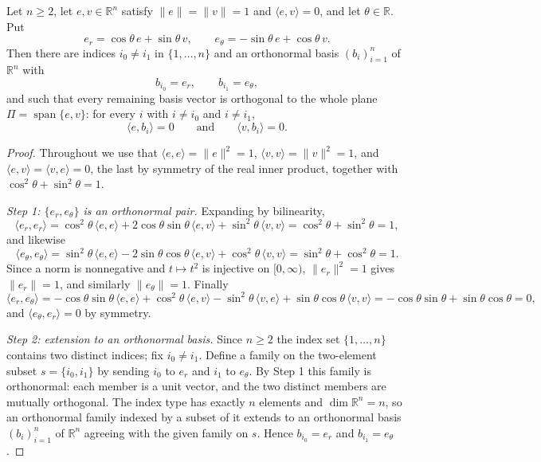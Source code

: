 \begin{lemma}
Let $n\ge 2$, let $e,v\in\mathbb{R}^n$ satisfy $\lVert e\rVert=\lVert v\rVert=1$ and
$\langle e,v\rangle=0$, and let $\theta\in\mathbb{R}$. Put
\[
  e_r=\cos\theta\,e+\sin\theta\,v,
  \qquad
  e_\theta=-\sin\theta\,e+\cos\theta\,v .
\]
Then there are indices $i_0\ne i_1$ in $\{1,\dots,n\}$ and an orthonormal basis
$(b_i)_{i=1}^{n}$ of $\mathbb{R}^n$ with
\[
  b_{i_0}=e_r,\qquad b_{i_1}=e_\theta,
\]
and such that every remaining basis vector is orthogonal to the whole plane
$\Pi=\operatorname{span}\{e,v\}$: for every $i$ with $i\ne i_0$ and $i\ne i_1$,
\[
  \langle e,b_i\rangle=0
  \qquad\text{and}\qquad
  \langle v,b_i\rangle=0 .
\]
\end{lemma}
\begin{proof}
Throughout we use that $\langle e,e\rangle=\lVert e\rVert^2=1$,
$\langle v,v\rangle=\lVert v\rVert^2=1$, and $\langle e,v\rangle=\langle v,e\rangle=0$,
the last by symmetry of the real inner product, together with
$\cos^2\theta+\sin^2\theta=1$.

\emph{Step 1: $\{e_r,e_\theta\}$ is an orthonormal pair.} Expanding by
bilinearity,
\[
  \langle e_r,e_r\rangle
  =\cos^2\theta\,\langle e,e\rangle+2\cos\theta\sin\theta\,\langle e,v\rangle
    +\sin^2\theta\,\langle v,v\rangle
  =\cos^2\theta+\sin^2\theta=1 ,
\]
and likewise
\[
  \langle e_\theta,e_\theta\rangle
  =\sin^2\theta\,\langle e,e\rangle-2\sin\theta\cos\theta\,\langle e,v\rangle
    +\cos^2\theta\,\langle v,v\rangle
  =\sin^2\theta+\cos^2\theta=1 .
\]
Since a norm is nonnegative and $t\mapsto t^2$ is injective on $[0,\infty)$,
$\lVert e_r\rVert^2=1$ gives $\lVert e_r\rVert=1$, and similarly $\lVert e_\theta\rVert=1$.
Finally
\[
  \langle e_r,e_\theta\rangle
  =-\cos\theta\sin\theta\,\langle e,e\rangle+\cos^2\theta\,\langle e,v\rangle
    -\sin^2\theta\,\langle v,e\rangle+\sin\theta\cos\theta\,\langle v,v\rangle
  =-\cos\theta\sin\theta+\sin\theta\cos\theta=0 ,
\]
and $\langle e_\theta,e_r\rangle=0$ by symmetry.

\emph{Step 2: extension to an orthonormal basis.} Since $n\ge 2$ the index set
$\{1,\dots,n\}$ contains two distinct indices; fix $i_0\ne i_1$. Define a
family on the two-element subset $s=\{i_0,i_1\}$ by sending $i_0$ to $e_r$ and
$i_1$ to $e_\theta$. By Step 1 this family is orthonormal: each member is a unit
vector, and the two distinct members are mutually orthogonal. The index type has
exactly $n$ elements and $\dim\mathbb{R}^n=n$, so an orthonormal family indexed
by a subset of it extends to an orthonormal basis $(b_i)_{i=1}^{n}$ of
$\mathbb{R}^n$ agreeing with the given family on $s$. Hence $b_{i_0}=e_r$ and
$b_{i_1}=e_\theta$.


\end{proof}

